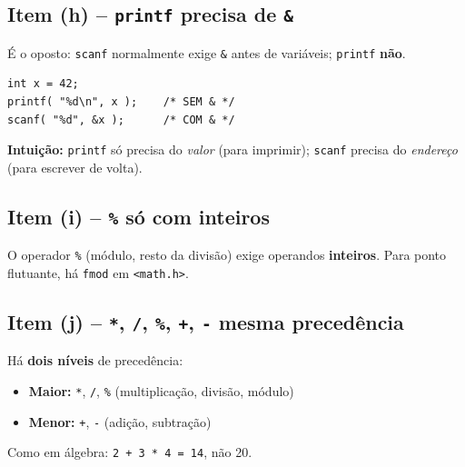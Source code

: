 \documentclass[12pt,a4paper]{article}
\begin{document}
\subsection*{Item (h) -- \texttt{printf} precisa de \texttt{\&}}
\begin{tcolorbox}[colback=red!5,colframe=deitelred,title={\bfseries FALSO}]
É o oposto: \texttt{scanf} normalmente exige \texttt{\&} antes de variáveis;
\texttt{printf} \textbf{não}.

\begin{lstlisting}
int x = 42;
printf( "%d\n", x );    /* SEM & */
scanf( "%d", &x );      /* COM & */
\end{lstlisting}

\textbf{Intuição:} \texttt{printf} só precisa do \textit{valor} (para imprimir);
\texttt{scanf} precisa do \textit{endereço} (para escrever de volta).
\end{tcolorbox}

\subsection*{Item (i) -- \texttt{\%} só com inteiros}
\begin{tcolorbox}[colback=green!5,colframe=deitelgreen,title={\bfseries VERDADEIRO}]
O operador \texttt{\%} (módulo, resto da divisão) exige operandos \textbf{inteiros}.
Para ponto flutuante, há \texttt{fmod} em \texttt{<math.h>}.
\end{tcolorbox}

\subsection*{Item (j) -- \texttt{*}, \texttt{/}, \texttt{\%}, \texttt{+}, \texttt{-} mesma precedência}
\begin{tcolorbox}[colback=red!5,colframe=deitelred,title={\bfseries FALSO}]
Há \textbf{dois níveis} de precedência:
\begin{itemize}[noitemsep]
  \item \textbf{Maior:} \texttt{*}, \texttt{/}, \texttt{\%} (multiplicação, divisão, módulo)
  \item \textbf{Menor:} \texttt{+}, \texttt{-} (adição, subtração)
\end{itemize}
Como em álgebra: \texttt{2 + 3 * 4 = 14}, não 20.
\end{tcolorbox}
\end{document}
